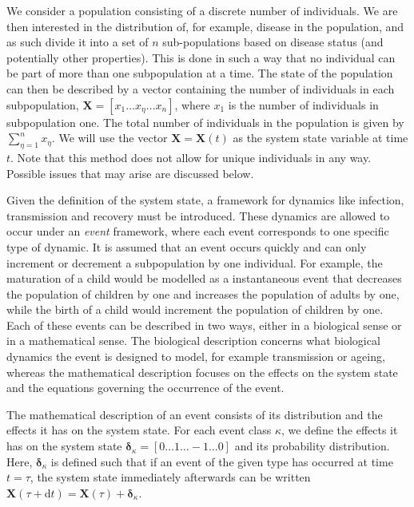 \documentclass[10pt,a4paper]{article}
\begin{document}





\newpage

We consider a population consisting of a discrete number of individuals. We are then interested in the distribution of, for example, disease in the population, and as such divide it into a set of $n$ sub-populations based on disease status (and potentially other properties). This is done in such a way that no individual can be part of more than one subpopulation at a time. The state of the population can then be described by a vector containing the number of individuals in each subpopulation, $\bm{X} = \left[ x_1 \ldots x_\eta \ldots x_n\right]$, where $x_1$ is the number of individuals in subpopulation one. The total number of individuals in the population is given by $\sum_{\eta = 1}^n x_{\eta}$. We will use the vector $\bm{X} = \bm{X} \left( t \right)$ as the system state variable at time $t$. Note that this method does not allow for unique individuals in any way. Possible issues that may arise are discussed below.

Given the definition of the system state, a framework for dynamics like infection, transmission and recovery must be introduced. These dynamics are allowed to occur under an \emph{event} framework, where each event corresponds to one specific type of dynamic. It is assumed that an event occurs quickly and can only increment or decrement a subpopulation by one individual. For example, the maturation of a child would be modelled as a instantaneous event that decreases the population of children by one and increases the population of adults by one, while the birth of a child would increment the population of children by one. Each of these events can be described in two ways, either in a biological sense or in a mathematical sense. The biological description concerns what biological dynamics the event is designed to model, for example transmission or ageing, whereas the mathematical description focuses on the effects on the system state and the equations governing the occurrence of the event.

The mathematical description of an event consists of its distribution and the effects it has on the system state. For each event class $\kappa$, we define the effects it has on the system state $\bm{\delta}_\kappa = \left[ 0 \ldots 1 \ldots -1 \ldots 0 \right]$ and its probability distribution. Here, $\bm{\delta}_\kappa$ is defined such that if an event of the given type has occurred at time $t = \tau$, the system state immediately afterwards can be written $\bm{X} \left( \tau + \mathrm{d} t \right) = \bm{X} \left( \tau \right) + \bm{\delta}_\kappa$. 
\end{document}
